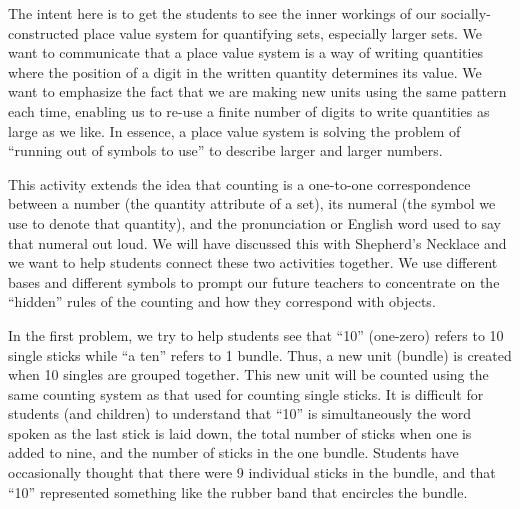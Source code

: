 \documentclass{ximera}
\begin{document}
\newpage
\begin{instructorNotes}
The intent here is to get the students to see the inner workings of our socially-constructed place value system for quantifying sets, especially larger sets. We want to communicate that a place value system is a way of writing quantities where the position of a digit in the written quantity determines its value. We want to emphasize the fact that we are making new units using the same pattern each time, enabling us to re-use a finite number of digits to write quantities as large as we like. In essence, a place value system is solving the problem of ``running out of symbols to use'' to describe larger and larger numbers.  

This activity extends the idea that counting is a one-to-one correspondence between a number (the quantity attribute of a set), its numeral (the symbol we use to denote that quantity), and the pronunciation or English word used to say that numeral out loud. We will have discussed this with Shepherd's Necklace and we want to help students connect these two activities together. We use different bases and different symbols to prompt our future teachers to concentrate on the ``hidden'' rules of the counting and how they correspond with objects.

In the first problem, we try to help students see that ``10'' (one-zero) refers to 10 single sticks while ``a ten'' refers to 1 bundle.  Thus, a new unit (bundle) is created when 10 singles are grouped together.  This new unit will be counted using the same counting system as that used for counting single sticks.  It is difficult for students (and children) to understand that ``10'' is simultaneously the word spoken as the last stick is laid down, the total number of sticks when one is added to nine, and the number of sticks in the one bundle.  Students have occasionally thought that there were 9 individual sticks in the bundle, and that ``10'' represented something like the rubber band that encircles the bundle.


\end{instructorNotes}
\end{document}
